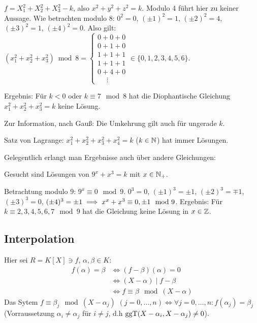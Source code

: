 \documentclass[a4paper,DIV15,BCOR12mm]{article}
\begin{document}
\begin{beispiel}
$f=X_1^2 + X_2^2 + X_3^2 - k$, also $x^2 + y^2 + z^2 = k$. Modulo 4
führt hier zu keiner Aussage. Wie betrachten modulo 8: $0^2 = 0$,
$(\pm1)^2 = 1$, $(\pm2)^2 = 4$, $(\pm3)^2=1$, $(\pm4)^2 = 0$. Also
gilt: $(x_1^2 + x_2^2 + x_3^2) \bmod 8 =
\begin{cases}
0+0+0 \\ 0+1+0 \\ 1+1+1 \\ 1+1+1 \\ 0 + 4+ 0 \\ \ \ \ \ \ \,\vdots  %
\end{cases} \in \{0,1,2,3,4,5,6\}$.

Ergebnis: Für $k<0$ oder $k\equiv 7 \mod 8$ hat die Diophantische
Gleichung $x_1^2 + x_2^2 + x_3^2 = k$ keine Lösung.

Zur Information, nach Gauß: Die Umkehrung gilt auch für ungerade $k$. %

Satz von Lagrange: $x_1^2 + x_2^2 + x_3^2 + x_4^2 = k$ ($k\in\mathbb{N}$)
hat immer Lösungen.
\end{beispiel}

Gelegentlich erlangt man Ergebnisse auch über andere Gleichungen:

\begin{beispiel}
Gesucht sind  Lösungen von $9^x + x^3 = k$ mit $x\in\mathbb{N}_+$.

Betrachtung modulo 9: $9^x \equiv 0 \mod 9$. $0^3 = 0$, $(\pm1)^3 =
\pm1$, $(\pm2)^3 = \mp 1$, $(\pm3)^3 = 0$, $(\pm4)^3 = \pm1 \implies
x^x+ x^3 \equiv 0 , \pm 1 \mod 9$. Ergebnis: Für $k \equiv
2,3,4,5,6,7 \mod 9$ hat die Gleichung keine Lösung in $x\in\mathbb{Z}$.
\end{beispiel}

\subsection{Interpolation}

Hier sei $R=K[X] \ni f$, $\alpha,\beta \in K$:
\begin{align*}
f(\alpha) = \beta &\iff (f-\beta)(\alpha) = 0 \\
&\iff (X-\alpha)\mid f-\beta \\
&\iff f \equiv \beta \mod (X-\alpha)
\end{align*}
Das Sytem $f \equiv \beta_j \mod (X-\alpha_j)$ $(j=0,\ldots,n) \iff
\forall j=0,\ldots,n : f(\alpha_j)=\beta_j$ (Vorraussetzung
$\alpha_i\ne \alpha_j$ für $i\ne j$, d.h
$\mathop{\rm ggT}\nolimits(X-\alpha_i,X-\alpha_j)\ne 0$).
\end{document}
